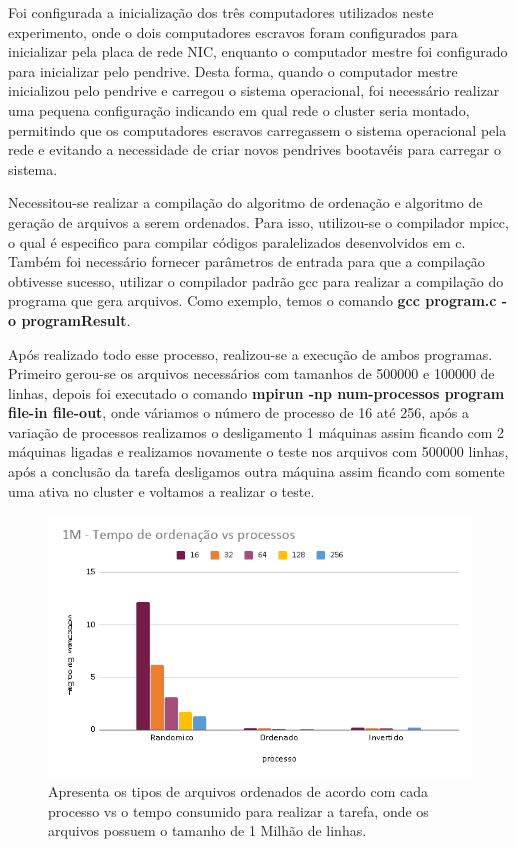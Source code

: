 \documentclass[12pt]{article}
\begin{document}
    Foi configurada a inicialização dos três computadores utilizados neste experimento, onde o dois computadores
    escravos foram configurados para inicializar pela placa de rede NIC, enquanto o computador mestre foi configurado
    para inicializar pelo pendrive. Desta forma, quando o computador mestre inicializou pelo pendrive e carregou o sistema
    operacional, foi necessário realizar uma pequena configuração indicando em qual rede o cluster seria montado, permitindo
    que os computadores escravos carregassem o sistema operacional pela rede e evitando a necessidade de criar novos pendrives
    bootavéis para carregar o sistema.

    Necessitou-se realizar a compilação do algoritmo de ordenação e algoritmo de geração de arquivos a serem ordenados. Para isso, utilizou-se o compilador mpicc, o qual é especifico para compilar códigos paralelizados desenvolvidos em c. Também foi necessário fornecer parâmetros de entrada para que a compilação obtivesse sucesso, utilizar o compilador padrão gcc para realizar a compilação do programa que gera arquivos. Como exemplo, temos o comando \textbf{gcc program.c -o programResult}.

    Após realizado todo esse processo, realizou-se a execução de ambos programas. Primeiro gerou-se os arquivos necessários com tamanhos de 500000 e 100000 de linhas, depois foi executado o comando \textbf{mpirun -np num-processos program file-in file-out}, onde váriamos o número de processo de 16 até 256, após a variação de processos realizamos o desligamento 1 máquinas assim ficando com 2 máquinas ligadas e realizamos novamente o teste nos arquivos com 500000 linhas, após a conclusão da tarefa desligamos outra máquina assim ficando com somente uma ativa no cluster e voltamos a realizar o teste.
    
    
    \begin{figure}[!htb]
         \centering
         \includegraphics[scale=.5]{chart/chart1.png}
         \caption{Apresenta os tipos de arquivos ordenados de acordo com cada processo vs o tempo consumido para realizar a tarefa, onde os arquivos possuem o tamanho de 1 Milhão de linhas.}
         \label{img:chart1}
    \end{figure}
   
\end{document}
